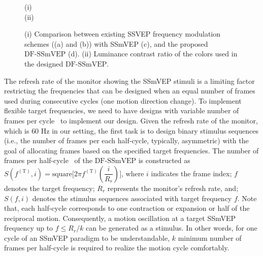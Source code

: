 \documentclass[sensors,accept,moreauthors,pdftex,10pt,a4paper]{mdpi}
\def\DFS{\text{DF-SSmVEP}} %
\def\Tar{^{(\text{T})}}
\theoremstyle{mdpi}
\newcounter{ex}
\newcounter{re}
\theoremstyle{mdpidefinition}
\begin{document}
\begin{figure}[t!]
\captionsetup[subfigure]{labelformat=empty}
\centering
\mbox{(i)}\\
\mbox{(ii)}
\caption{\footnotesize  (i) Comparison between existing SSVEP frequency modulation schemes ((a) and (b)) with SSmVEP (c), and the proposed $\DFS$ (d). (ii) Luminance contrast ratio of the colors used in the designed $\DFS$. \label{Fig:DF-SSmVEP2}}
\end{figure}

The refresh rate of the monitor showing the SSmVEP stimuli is a limiting factor restricting the frequencies that can be designed when an equal number of frames used during consecutive cycles (one motion direction change). To implement flexible target frequencies, we need to have designs with variable number of frames per cycle~\cite{nakanishi2013approximation} to implement our design. Given the refresh rate of the monitor, which is $60$ Hz in our setting, the first task is to design binary stimulus sequences (i.e., the number of frames per each half-cycle, typically, asymmetric) with the goal of allocating frames based on the specified target frequencies. The number of frames per half-cycle~\cite{nakanishi2013approximation} of the $\DFS$ is constructed as $S(f\Tar,i) = \text{square}\big[2 \pi f\Tar(\dfrac{i}{R_{r}})\big]$,
where $i$ indicates the frame index; $f$ denotes the target frequency; $R_{r}$ represents the monitor's refresh rate, and; $S(f,i)$ denotes the stimulus sequences associated with target frequency $f$. Note that, each half-cycle corresponds to one contraction or expansion or half of the reciprocal motion. Consequently,  a motion oscillation at a target SSmVEP frequency up to $f \leq R_{r}/k$ can be generated as a stimulus. In other words, for one cycle of an SSmVEP paradigm to be understandable, $k$ minimum number of  frames per half-cycle is required to realize the motion cycle comfortably.
\end{document}
